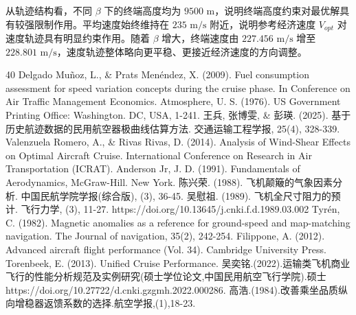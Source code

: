 \documentclass[withoutpreface,bwprint]{cumcmthesis} %
\begin{document}
从轨迹结构看，不同 $\beta$ 下的终端高度均为 $9500\text{ m}$，说明终端高度约束对最优解具有较强限制作用。平均速度始终维持在 $235\text{ m/s}$ 附近，说明参考经济速度 $V_{opt}$ 对速度轨迹具有明显约束作用。随着 $\beta$ 增大，终端速度由 $227.456\text{ m/s}$ 增至 $228.801\text{ m/s}$，速度轨迹整体略向更平稳、更接近经济速度的方向调整。
\newpage
\begin{thebibliography}{40}
	Delgado Muñoz, L., \& Prats Menéndez, X. (2009). Fuel consumption assessment for speed variation concepts during the cruise phase. In Conference on Air Traffic Management Economics.
	Atmosphere, U. S. (1976). US Government Printing Office: Washington. DC, USA, 1-241.
    王兵, 张博雯, \& 彭瑛. (2025). 基于历史航迹数据的民用航空器极曲线估算方法. 交通运输工程学报, 25(4), 328-339.
	Valenzuela Romero, A., \& Rivas Rivas, D. (2014). Analysis of Wind-Shear Effects on Optimal Aircraft Cruise. International Conference on Research in Air Transportation (ICRAT).
    Anderson Jr, J. D. (1991). Fundamentals of Aerodynamics, McGraw-Hill. New York.
    陈兴荣. (1988). 飞机颠簸的气象因素分析. 中国民航学院学报(综合版), (3), 36-45.
    吴慰祖. (1989). 飞机全尺寸阻力的预计. 飞行力学, (3), 11-27. https://doi.org/10.13645/j.cnki.f.d.1989.03.002
    Tyrén, C. (1982). Magnetic anomalies as a reference for ground-speed and map-matching navigation. The Journal of navigation, 35(2), 242-254.
    Filippone, A. (2012). Advanced aircraft flight performance (Vol. 34). Cambridge University Press.
    Torenbeek, E. (2013). Unified Cruise Performance.
    吴奕铭.(2022).运输类飞机商业飞行的性能分析规范及实例研究(硕士学位论文,中国民用航空飞行学院).硕士https://doi.org/10.27722/d.cnki.gzgmh.2022.000286.
    高浩.(1984).改善乘坐品质纵向增稳器返馈系数的选择.航空学报,(1),18-23.
\end{thebibliography}
\newpage
{}	%
\end{document}
